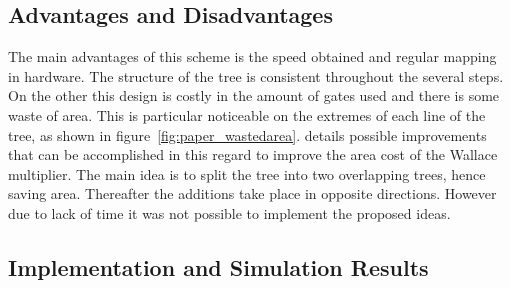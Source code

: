\subsection{Advantages and Disadvantages}

The main advantages of this scheme is the speed obtained and regular mapping in hardware. The structure of the tree is consistent throughout the several steps. On the other this design is costly in the amount of gates used and there is some waste of area. This is particular noticeable on the extremes of each line of the tree, as shown in figure~\ref{fig:paper_wastedarea}. \Cite{betterwallace} details possible improvements that can be accomplished in this regard to improve the area cost of the Wallace multiplier. The main idea is to split the tree into two overlapping trees, hence saving area. Thereafter the additions take place in opposite directions. 
However due to lack of time it was not possible to implement the proposed ideas.

\begin{figure}[H]
\centering

\qquad
{}
\caption{}
\label{fig:paper}
\end{figure}


\subsection{Implementation and Simulation Results}
\label{sec:implementation}
